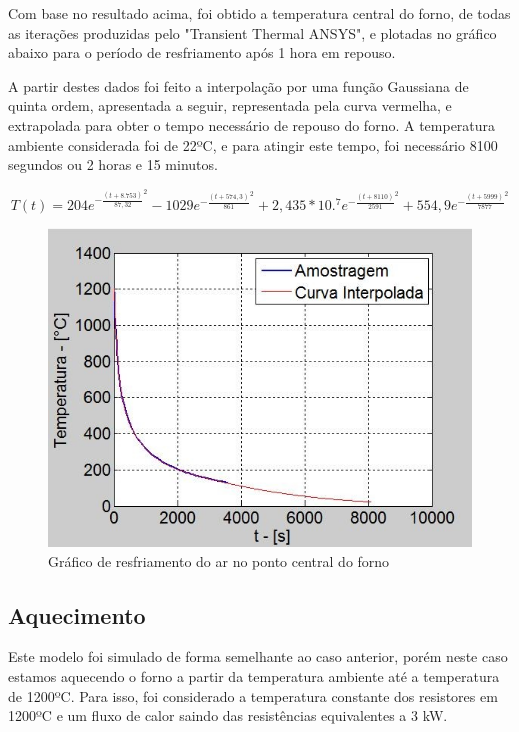 Com base no resultado acima, foi obtido a temperatura central do forno, de todas as
iterações produzidas pelo "Transient Thermal ANSYS", e plotadas no gráfico abaixo para o período
de resfriamento após 1 hora em repouso.

A partir destes dados foi feito a interpolação por uma função Gaussiana de quinta ordem,
apresentada a seguir, representada pela curva vermelha, e extrapolada para obter o tempo
necessário de repouso do forno. A temperatura ambiente considerada foi de 22ºC, e para atingir
este tempo, foi necessário 8100 segundos ou 2 horas e 15 minutos.

\begin{equation}
T(t) = 204 e^{-\frac{(t+8.753)}{87,32}^2}
- 1029e^{-\frac{(t+574,3)}{861}^2} + 2,435*10.^7e^{-\frac{(t+8110)}{2591}^2} + 554,9e^{-
\frac{(t+5999)}{7877}^2}
\end{equation}
\begin{figure}[H]
	\centering
	\label{ansys14}
	\includegraphics[keepaspectratio=true,scale=0.5]{figuras/ansys14.jpg}
    \caption{Gráfico de resfriamento do ar no ponto central do forno}
\end{figure}

\subsection{Aquecimento}
Este modelo foi simulado de forma semelhante ao caso anterior, porém neste caso estamos
aquecendo o forno a partir da temperatura ambiente até a temperatura de 1200ºC. Para isso, foi
considerado a temperatura constante dos resistores em 1200ºC e um fluxo de calor saindo das
resistências equivalentes a 3 kW.

